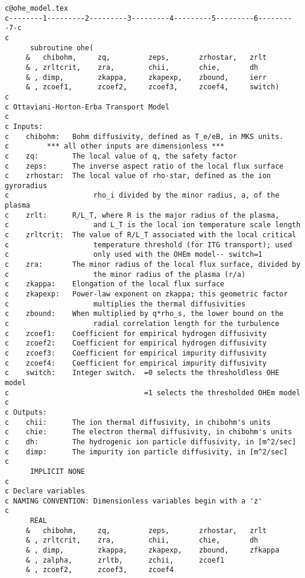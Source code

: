 \begin{verbatim}
c@ohe_model.tex
c--------1---------2---------3---------4---------5---------6---------7-c
c
      subroutine ohe(
     &   chibohm,     zq,         zeps,       zrhostar,   zrlt
     & , zrltcrit,    zra,        chii,       chie,       dh
     & , dimp,        zkappa,     zkapexp,    zbound,     ierr
     & , zcoef1,      zcoef2,     zcoef3,     zcoef4,     switch)
c
c Ottaviani-Horton-Erba Transport Model
c
c Inputs:
c    chibohm:   Bohm diffusivity, defined as T_e/eB, in MKS units.
c         *** all other inputs are dimensionless ***
c    zq:        The local value of q, the safety factor
c    zeps:      The inverse aspect ratio of the local flux surface
c    zrhostar:  The local value of rho-star, defined as the ion gyroradius
c                    rho_i divided by the minor radius, a, of the plasma
c    zrlt:      R/L_T, where R is the major radius of the plasma,
c                    and L_T is the local ion temperature scale length
c    zrltcrit:  The value of R/L_T associated with the local critical
c                    temperature threshold (for ITG transport); used
c                    only used with the OHEm model-- switch=1
c    zra:       The minor radius of the local flux surface, divided by 
c                    the minor radius of the plasma (r/a)
c    zkappa:    Elongation of the local flux surface
c    zkapexp:   Power-law exponent on zkappa; this geometric factor
c                    multiplies the thermal diffusivities
c    zbound:    When multiplied by q*rho_s, the lower bound on the
c                    radial correlation length for the turbulence
c    zcoef1:    Coefficient for empirical hydrogen diffusivity
c    zcoef2:    Coefficient for empirical hydrogen diffusivity
c    zcoef3:    Coefficient for empirical impurity diffusivity
c    zcoef4:    Coefficient for empirical impurity diffusivity
c    switch:    Integer switch.  =0 selects the thresholdless OHE model
c                                =1 selects the thresholded OHEm model
c
c Outputs:
c    chii:      The ion thermal diffusivity, in chibohm's units
c    chie:      The electron thermal diffusivity, in chibohm's units
c    dh:        The hydrogenic ion particle diffusivity, in [m^2/sec]
c    dimp:      The impurity ion particle diffusivity, in [m^2/sec]
c
      IMPLICIT NONE
c
c Declare variables
c NAMING CONVENTION: Dimensionless variables begin with a 'z'
c
      REAL
     &   chibohm,     zq,         zeps,       zrhostar,   zrlt
     & , zrltcrit,    zra,        chii,       chie,       dh
     & , dimp,        zkappa,     zkapexp,    zbound,     zfkappa
     & , zalpha,      zrltb,      zchii,      zcoef1
     & , zcoef2,      zcoef3,     zcoef4


\end{verbatim}
